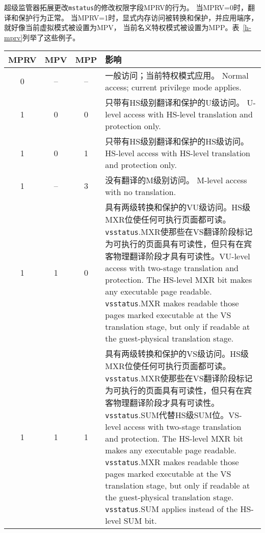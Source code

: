 超级监管器拓展更改{\tt mstatus}的修改权限字段MPRV的行为。
当MPRV=0时，翻译和保护行为正常。
当MPRV=1时，显式内存访问被转换和保护，并应用端序，就好像当前虚拟模式被设置为MPV，
当前名义特权模式被设置为MPP。表~\ref{h-mprv}列举了这些例子。

\begin{table*}[h!]
\begin{center}
\begin{tabular}{|c|c|c||p{4.5in}|}
  \hline
   MPRV & MPV & MPP & 影响 \\ \hline \hline
   0    & --  & --  & 一般访问；当前特权模式应用。 Normal access; current privilege mode applies. \\ \hline
   1    & 0   & 0   & 只带有HS级别翻译和保护的U级访问。 U-level access with HS-level translation and protection only. \\ \hline
   1    & 0   & 1   & 只带有HS级别翻译和保护的HS级访问。 HS-level access with HS-level translation and protection only.  \\ \hline
   1    & --  & 3   & 没有翻译的M级别访问。 M-level access with no translation. \\ \hline
   1    & 1   & 0   & 具有两级转换和保护的VU级访问。HS级MXR位使任何可执行页面都可读。{\tt vsstatus}.MXR使那些在VS翻译阶段标记为可执行的页面具有可读性，但只有在宾客物理翻译阶段才具有可读性。VU-level access with two-stage translation and protection. The HS-level MXR bit makes any executable page readable.  {\tt vsstatus}.MXR makes readable those pages marked executable at the VS translation stage, but only if readable at the guest-physical translation stage. \\ \hline
   1    & 1   & 1   & 具有两级转换和保护的VS级访问。HS级MXR位使任何可执行页面都可读。{\tt vsstatus}.MXR使那些在VS翻译阶段标记为可执行的页面具有可读性，但只有在宾客物理翻译阶段才具有可读性。{\tt vsstatus}.SUM代替HS级SUM位。VS-level access with two-stage translation and protection. The HS-level MXR bit makes any executable page readable.  {\tt vsstatus}.MXR makes readable those pages marked executable at the VS translation stage, but only if readable at the guest-physical translation stage.  {\tt vsstatus}.SUM applies instead of the HS-level SUM bit. \\ \hline
 \end{tabular}
\end{center}
\caption{在显示内存访问的翻译和保护中，MPRV的影响。
}
\label{h-mprv}
\end{table*}

